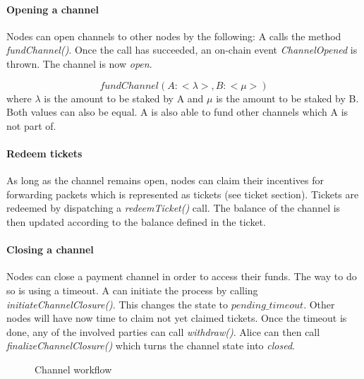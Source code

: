 \paragraph{Opening a channel} Nodes can open channels to other nodes by the following:
A calls the method \textit{fundChannel()}. Once the call has succeeded, an on-chain event \textit{ChannelOpened} is thrown. The channel is now \textit{open}.


$$fundChannel(A: <\lambda>, B: <\mu>)$$ where $\lambda$ is the amount to be staked by A and $\mu$ is the amount to be staked by B. Both values can also be equal. A is also able to fund other channels which A is not part of.

\paragraph{Redeem tickets}
As long as the channel remains open, nodes can claim their incentives for forwarding packets which is represented as tickets (see ticket section). Tickets are redeemed by dispatching a \textit{redeemTicket()} call. The balance of the channel is then updated according to the balance defined in the ticket.
\paragraph{Closing a channel}
Nodes can close a payment channel in order to access their funds. The way to do so is using a timeout.
A can initiate the process by calling \textit{initiateChannelClosure()}. This changes the state to $pending\_timeout$. Other nodes will have now time to claim not yet claimed tickets. Once the timeout is done, any of the involved parties can call \textit{withdraw()}. Alice can then call \textit{finalizeChannelClosure()} which turns the channel state into \textit{closed}.

\begin{figure}[H]
    \centering
    \label{fig:channel workflow}
    \caption{Channel workflow}
\end{figure}